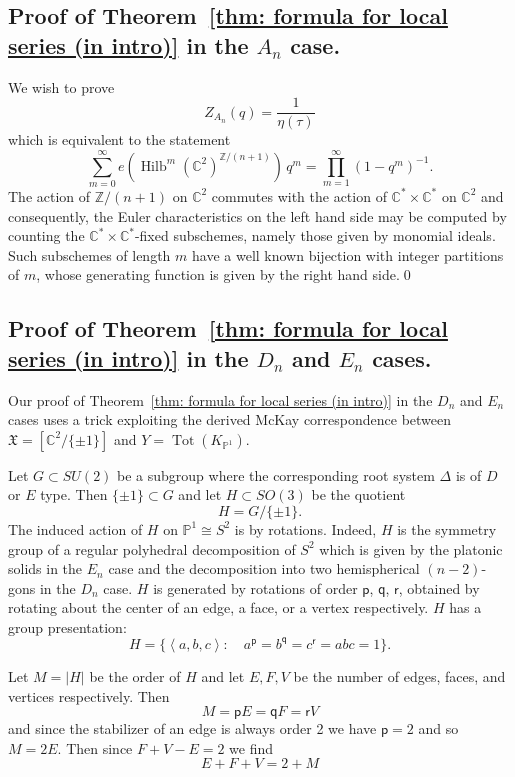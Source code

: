 \documentclass{amsart}
\theoremstyle{definition}
\newcommand{\CC} {{\mathbb C}}          %
\newcommand{\ZZ} {{\mathbb Z}}		%
\newcommand{\PP}{\mathbb{P}}
\newcommand{\X}{\mathfrak{X}}
\newcommand{\varp}{\mathsf{p}}
\newcommand{\varq}{\mathsf{q}}
\newcommand{\varr}{\mathsf{r}}
\newcommand{\Hilb}{\operatorname{Hilb}}
\begin{document}
\subsection{Proof of Theorem~\ref{thm: formula for local series (in
intro)} in the $A_{n}$ case.}\label{subsec: proof of An case of
local series}

We wish to prove
\[
Z_{A_{n}}(q) = \frac{1}{\eta (\tau )}
\]
which is equivalent to the statement
\[
\sum_{m=0}^{\infty} e\left(\Hilb^{m} (\CC^{2})^{\ZZ /(n+1)} \right)
\,q^{m} = \prod_{m=1}^{\infty} (1-q^{m})^{-1}.
\]
The action of $\ZZ /(n+1)$ on $\CC^{2}$ commutes with the action of
$\CC^{*}\times \CC^{*}$ on $\CC^{2}$ and consequently, the Euler
characteristics on the left hand side may be computed by counting
the $\CC^{*}\times \CC^{*}$-fixed subschemes, namely those given by
monomial ideals. Such subschemes of length $m$ have a well known
bijection with integer partitions of $m$, whose generating function is
given by the right hand side.\qed 

\subsection{Proof of Theorem~\ref{thm: formula for local series (in
intro)} in the $D_{n}$ and $E_{n}$ cases.}\label{subsec: proof of Dn
and En cases of local series}

Our proof of Theorem~\ref{thm: formula for local series (in intro)} in
the $D_{n}$ and $E_{n}$ cases uses a trick exploiting the derived
McKay correspondence between $\X =[\CC^{2}/\{\pm 1 \}]$ and
$Y=\operatorname{Tot}(K_{\PP^{1}})$. 

Let $G\subset SU(2)$ be a subgroup where the corresponding root system
$\Delta$ is of $D$ or $E$ type. Then $\{\pm 1 \}\subset G$ and let
$H\subset SO(3)$ be the quotient
\[
H=G/\{\pm 1 \}.
\]
The induced action of $H$ on $\PP^{1}\cong S^{2}$ is by
rotations. Indeed, $H$ is the symmetry group of a regular polyhedral
decomposition of $S^{2}$ which is given by the platonic solids in the
$E_{n}$ case and the decomposition into two hemispherical $(n-2)$-gons
in the $D_{n}$ case. $H$ is generated by rotations of order $\varp$,
$\varq$, $\varr$, obtained by rotating about the center of an edge, a
face, or a vertex respectively. $H$ has a group presentation:
\[
H=\{\left\langle a,b,c \right\rangle :\quad a^{\varp} = b^{\varq} =
c^{\varr} = abc=1 \}.
\]

Let $M=|H|$ be the order of $H$ and let $E,F,V$ be the number of
edges, faces, and vertices respectively. Then
\[
M=\varp E = \varq F = \varr V
\]
and since the stabilizer of an edge is always order 2 we have $\varp =2$
and so $M=2E$. Then since $F+V-E=2$ we find
\[
E+F+V = 2 + M
\]
\end{document}
